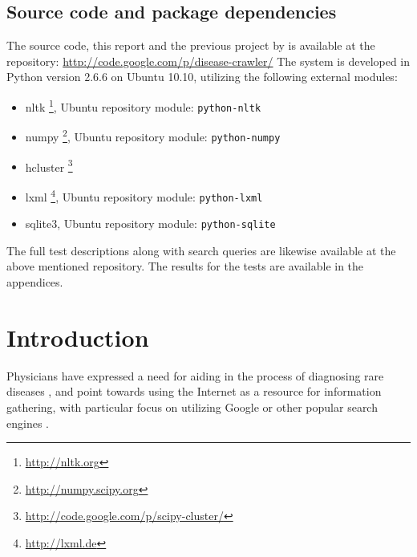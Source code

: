 \documentclass[10pt,letterpaper,final]{article}
\begin{document}
\subsection{Source code and package dependencies}
The source code, this report and the previous project by
\cite{jensenandersen} is available at the repository:
\url{http://code.google.com/p/disease-crawler/}
The system is developed in Python version 2.6.6 on Ubuntu 10.10,
utilizing the following external modules:
\begin{itemize}
\item nltk \footnote{\url{http://nltk.org}}, Ubuntu repository module: \texttt{python-nltk}
\item numpy \footnote{\url{http://numpy.scipy.org}}, Ubuntu repository module: \texttt{python-numpy}
\item hcluster \footnote{\url{http://code.google.com/p/scipy-cluster/}}
\item lxml \footnote{\url{http://lxml.de}}, Ubuntu repository module: \texttt{python-lxml}
\item sqlite3, Ubuntu repository module: \texttt{python-sqlite}
\end{itemize}

The full test descriptions along with search queries are likewise
available at the above mentioned repository. The results for the tests
are available in the appendices.





\section{Introduction}
Physicians have expressed a need for aiding in the process of diagnosing
rare diseases \cite{googlingdiagnosis}, and point towards using the
Internet as a resource for information gathering, with particular focus
on utilizing Google or other popular search engines
\cite{googlechangemedicine} \cite{diagnosissearchengines}.
\end{document}
